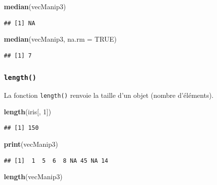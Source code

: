 \documentclass[]{book}
\newenvironment{Shaded}{\begin{snugshade}}{\end{snugshade}}
\newcommand{\DataTypeTok}[1]{\textcolor[rgb]{0.13,0.29,0.53}{#1}}
\newcommand{\DecValTok}[1]{\textcolor[rgb]{0.00,0.00,0.81}{#1}}
\newcommand{\KeywordTok}[1]{\textcolor[rgb]{0.13,0.29,0.53}{\textbf{#1}}}
\newcommand{\NormalTok}[1]{#1}
\newcommand{\OtherTok}[1]{\textcolor[rgb]{0.56,0.35,0.01}{#1}}
\begin{document}
\begin{Shaded}
\begin{Highlighting}[]
\KeywordTok{median}\NormalTok{(vecManip3)}
\end{Highlighting}
\end{Shaded}

\begin{verbatim}
## [1] NA
\end{verbatim}

\begin{Shaded}
\begin{Highlighting}[]
\KeywordTok{median}\NormalTok{(vecManip3, }\DataTypeTok{na.rm =} \OtherTok{TRUE}\NormalTok{)}
\end{Highlighting}
\end{Shaded}

\begin{verbatim}
## [1] 7
\end{verbatim}

\hypertarget{l015length}{%
\subsubsection{\texorpdfstring{\texttt{length()}}{length()}}\label{l015length}}

La fonction \texttt{length()} renvoie la taille d'un objet (nombre d'éléments).

\begin{Shaded}
\begin{Highlighting}[]
\KeywordTok{length}\NormalTok{(iris[, }\DecValTok{1}\NormalTok{])}
\end{Highlighting}
\end{Shaded}

\begin{verbatim}
## [1] 150
\end{verbatim}

\begin{Shaded}
\begin{Highlighting}[]
\KeywordTok{print}\NormalTok{(vecManip3)}
\end{Highlighting}
\end{Shaded}

\begin{verbatim}
## [1]  1  5  6  8 NA 45 NA 14
\end{verbatim}

\begin{Shaded}
\begin{Highlighting}[]
\KeywordTok{length}\NormalTok{(vecManip3)}
\end{Highlighting}
\end{Shaded}
\end{document}
